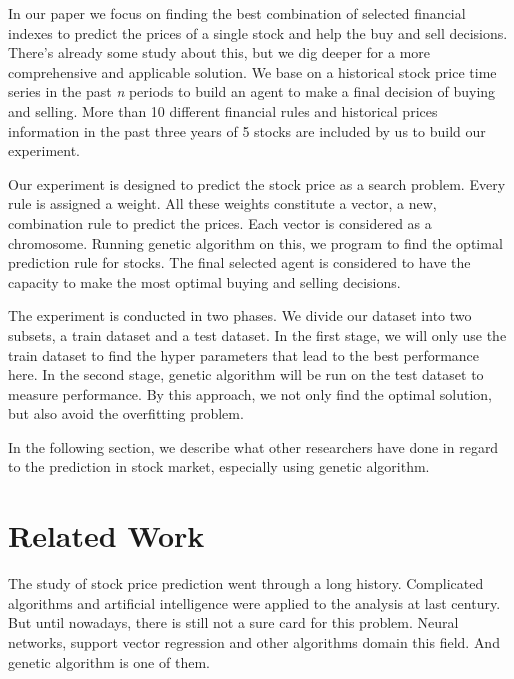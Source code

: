\documentclass{article}
\begin{document}
In our paper we focus on finding the best combination of selected financial indexes
to predict the prices of a single stock and help the buy and sell decisions.
There's already some study about this, but we dig deeper for a more comprehensive and applicable solution.
\cite{genetic-algorithms-for-predicting-the-egyptian-stock-market}
\cite{genetic-algorithms-to-optimise-the-time-to-make-stock-market-investment}
We base on a historical stock price time series in the past \emph{n} periods
to build an agent to make a final decision of buying and selling.
More than 10 different financial rules and historical prices information
in the past three years of 5 stocks are included by us to build our experiment.

Our experiment is designed to predict the stock price as a search problem.
Every rule is assigned a weight.
All these weights constitute a vector, a new, combination rule to predict the prices.
Each vector is considered as a chromosome.
Running genetic algorithm on this, we program to find the optimal prediction rule for stocks.
The final selected agent is considered to have the capacity to make the most optimal buying and selling decisions.

The experiment is conducted in two phases.
We divide our dataset into two subsets, a train dataset and a test dataset.
In the first stage, we will only use the train dataset to find the hyper parameters that lead to the best performance here.
In the second stage, genetic algorithm will be run on the test dataset to measure performance.
By this approach, we not only find the optimal solution, but also avoid the overfitting problem.

In the following section, we describe what other researchers have done in regard to the prediction in stock market, especially using genetic algorithm.

\section{Related Work}

The study of stock price prediction went through a long history.
Complicated algorithms and artificial intelligence were applied to the analysis at last century. \cite{application-of-neural-network-to-technical-analysis}
But until nowadays, there is still not a sure card for this problem.
Neural networks, support vector regression and other algorithms domain this field. \cite{textual-analysis-of-stock-market-prediction}
And genetic algorithm is one of them.
\end{document}
